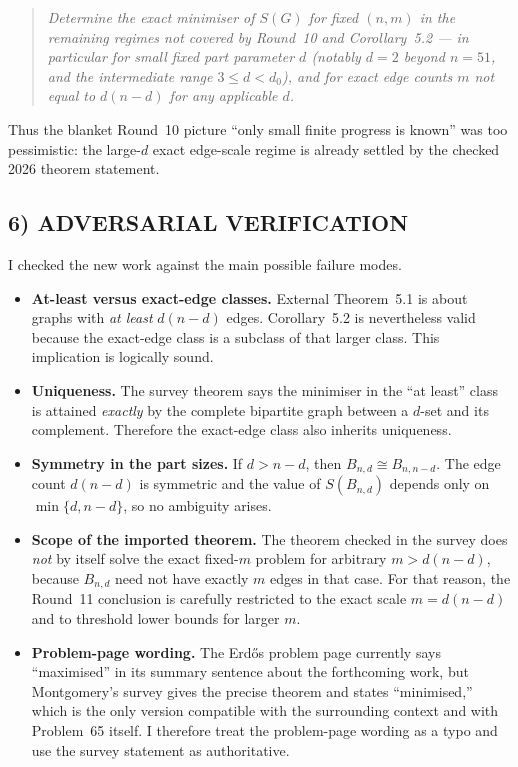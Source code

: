 \begin{quote}
\emph{Determine the exact minimiser of $S(G)$ for fixed $(n,m)$ in the remaining regimes not covered by Round~10 and Corollary~5.2 --- in particular for small fixed part parameter $d$ (notably $d=2$ beyond $n=51$, and the intermediate range $3\le d<d_0$), and for exact edge counts $m$ not equal to $d(n-d)$ for any applicable $d$.}
\end{quote}

Thus the blanket Round~10 picture ``only small finite progress is known'' was too pessimistic: the large-$d$ exact edge-scale regime is already settled by the checked 2026 theorem statement.

\subsection*{6) ADVERSARIAL VERIFICATION}

I checked the new work against the main possible failure modes.

\begin{itemize}
\item \textbf{At-least versus exact-edge classes.}
External Theorem~5.1 is about graphs with \emph{at least} $d(n-d)$ edges. Corollary~5.2 is nevertheless valid because the exact-edge class is a subclass of that larger class. This implication is logically sound.

\item \textbf{Uniqueness.}
The survey theorem says the minimiser in the ``at least'' class is attained \emph{exactly} by the complete bipartite graph between a $d$-set and its complement. Therefore the exact-edge class also inherits uniqueness.

\item \textbf{Symmetry in the part sizes.}
If $d>n-d$, then $B_{n,d}\cong B_{n,n-d}$. The edge count $d(n-d)$ is symmetric and the value of $S(B_{n,d})$ depends only on $\min\{d,n-d\}$, so no ambiguity arises.

\item \textbf{Scope of the imported theorem.}
The theorem checked in the survey does \emph{not} by itself solve the exact fixed-$m$ problem for arbitrary $m>d(n-d)$, because $B_{n,d}$ need not have exactly $m$ edges in that case. For that reason, the Round~11 conclusion is carefully restricted to the exact scale $m=d(n-d)$ and to threshold lower bounds for larger $m$.

\item \textbf{Problem-page wording.}
The Erd\H{o}s problem page currently says ``maximised'' in its summary sentence about the forthcoming work, but Montgomery's survey gives the precise theorem and states ``minimised,'' which is the only version compatible with the surrounding context and with Problem~65 itself. I therefore treat the problem-page wording as a typo and use the survey statement as authoritative.
\end{itemize}

